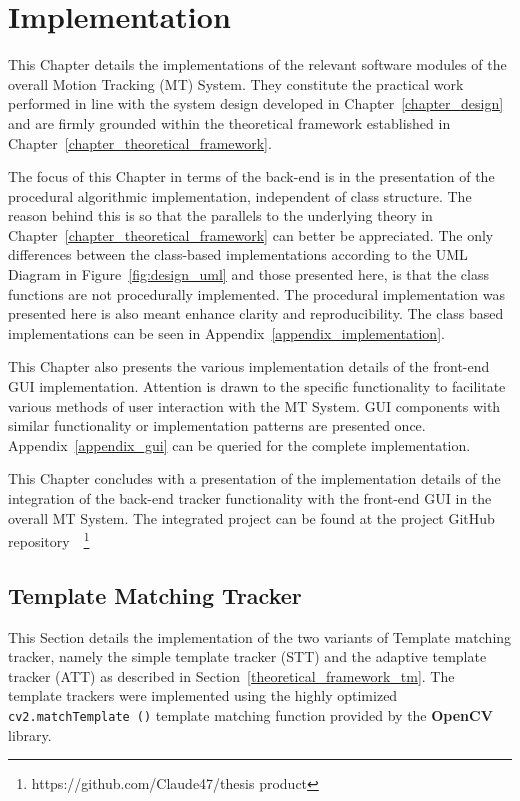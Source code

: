 \chapter{Implementation}\label{chapter_implementation}
This Chapter details the implementations of the relevant software modules of the
overall Motion Tracking (MT) System. They constitute the practical work performed in line with the system design
developed in Chapter~\ref{chapter_design} and are firmly grounded within the theoretical framework
established in Chapter~\ref{chapter_theoretical_framework}.

The focus of this Chapter in terms of the back-end is in the presentation of the
procedural algorithmic implementation, independent of class structure. The
reason behind this is so that the parallels to the underlying theory in
Chapter~\ref{chapter_theoretical_framework} can better be appreciated.
The only differences between the class-based implementations according to the
UML Diagram in Figure~\ref{fig:design_uml} and those presented here, is that the
class functions are not procedurally implemented. The procedural implementation
was presented here is also meant enhance clarity and reproducibility. The class based
implementations can be seen in Appendix~\ref{appendix_implementation}.

This Chapter also presents the various implementation details of the front-end
GUI implementation. Attention is drawn to the specific functionality to
facilitate various methods of user interaction with the MT System. GUI
components with similar functionality or implementation patterns are presented
once. Appendix~\ref{appendix_gui} can be queried for the complete
implementation. 

This Chapter concludes with a presentation of the implementation details of the
integration of the back-end tracker functionality with the front-end GUI in the
overall MT System. The integrated project can be found at the project GitHub
repository~\cite{repository}~\footnote{https://github.com/Claude47/thesis product}


\section{Template Matching Tracker}\label{implementation_tm}
This Section details the implementation of the two variants of Template matching
tracker, namely the simple template tracker (STT) and the adaptive template
tracker (ATT) as described in Section~\ref{theoretical_framework_tm}. The template trackers were
implemented using the highly optimized \lstinline{cv2.matchTemplate ()} template
matching function provided by the \textbf{OpenCV} library.  

